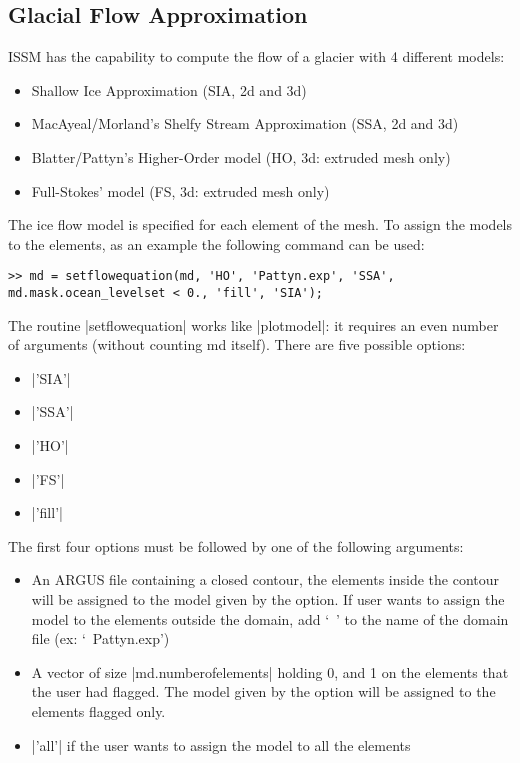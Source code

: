 
\subsection{Glacial Flow Approximation} \label{sec:using-issm-capabilities-glacial-flow}
ISSM has the capability to compute the flow of a glacier with 4 different models:
\begin{itemize}
	\item Shallow Ice Approximation (SIA, 2d and 3d)
	\item MacAyeal/Morland's Shelfy Stream Approximation (SSA, 2d and 3d)
	\item Blatter/Pattyn's Higher-Order model (HO, 3d: extruded mesh only)
	\item Full-Stokes' model (FS, 3d: extruded mesh only)
\end{itemize}

The ice flow model is specified for each element of the mesh. To assign the models to the elements, as an example the following command can be used:
\begin{lstlisting}
>> md = setflowequation(md, 'HO', 'Pattyn.exp', 'SSA', md.mask.ocean_levelset < 0., 'fill', 'SIA');
\end{lstlisting}
The routine \lstinlinebg|setflowequation| works like \lstinlinebg|plotmodel|: it requires an even number of arguments (without counting md itself). There are five possible options:
\begin{itemize}
	\item \lstinlinebg|'SIA'|
	\item \lstinlinebg|'SSA'|
	\item \lstinlinebg|'HO'|
	\item \lstinlinebg|'FS'|
	\item \lstinlinebg|'fill'|
\end{itemize}

The first four options must be followed by one of the following arguments:
\begin{itemize}
	\item An ARGUS file containing a closed contour, the elements inside the contour will be assigned to the model given by the option.  If user wants to assign the model to the elements outside the domain, add `~' to the name of the domain file (ex: `~Pattyn.exp')
	\item A vector of size \lstinlinebg|md.numberofelements| holding 0, and 1 on the elements that the user had flagged. The model given by the option will be assigned to the elements flagged only.
	\item \lstinlinebg|'all'| if the user wants to assign the model to all the elements
\end{itemize}

